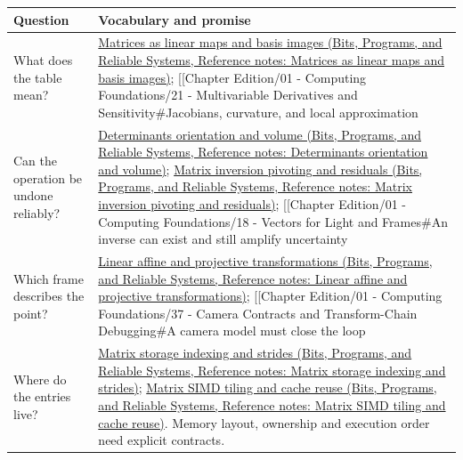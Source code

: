 {\def\LTcaptype{none} %
\begin{longtable}[]{@{}
  >{\raggedright\arraybackslash}p{}
  >{\raggedright\arraybackslash}p{}@{}}
\toprule\noalign{}
\begin{minipage}[b]{\linewidth}\raggedright
Question
\end{minipage} & \begin{minipage}[b]{\linewidth}\raggedright
Vocabulary and promise
\end{minipage} \\
\midrule\noalign{}
\endhead
\bottomrule\noalign{}
\endlastfoot
What does the table mean? & \href{../01-Bits-Programs-and-Reliable-Systems/main.pdf\#nameddest=appendix-bd39c3bf5d64}{Matrices as linear maps and basis images (Bits, Programs, and Reliable Systems, Reference notes: Matrices as linear maps and basis images)}; {[}{[}Chapter Edition/01 - Computing Foundations/21 - Multivariable Derivatives and Sensitivity\#Jacobians, curvature, and local approximation \\
Can the operation be undone reliably? & \href{../01-Bits-Programs-and-Reliable-Systems/main.pdf\#nameddest=appendix-da478be01d02}{Determinants orientation and volume (Bits, Programs, and Reliable Systems, Reference notes: Determinants orientation and volume)}; \href{../01-Bits-Programs-and-Reliable-Systems/main.pdf\#nameddest=appendix-48d2e66378ab}{Matrix inversion pivoting and residuals (Bits, Programs, and Reliable Systems, Reference notes: Matrix inversion pivoting and residuals)}; {[}{[}Chapter Edition/01 - Computing Foundations/18 - Vectors for Light and Frames\#An inverse can exist and still amplify uncertainty \\
Which frame describes the point? & \href{../01-Bits-Programs-and-Reliable-Systems/main.pdf\#nameddest=appendix-0bf0ca73f735}{Linear affine and projective transformations (Bits, Programs, and Reliable Systems, Reference notes: Linear affine and projective transformations)}; {[}{[}Chapter Edition/01 - Computing Foundations/37 - Camera Contracts and Transform-Chain Debugging\#A camera model must close the loop \\
Where do the entries live? & \href{../01-Bits-Programs-and-Reliable-Systems/main.pdf\#nameddest=appendix-ffdc1d4e5350}{Matrix storage indexing and strides (Bits, Programs, and Reliable Systems, Reference notes: Matrix storage indexing and strides)}; \href{../01-Bits-Programs-and-Reliable-Systems/main.pdf\#nameddest=appendix-1bfb7c657105}{Matrix SIMD tiling and cache reuse (Bits, Programs, and Reliable Systems, Reference notes: Matrix SIMD tiling and cache reuse)}. Memory layout, ownership and execution order need explicit contracts. \\

\end{longtable}}
